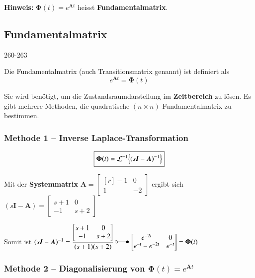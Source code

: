 \textbf{Hinweis:} $\bm{\Phi}(t) = e^{\bm{A} t}$ heisst \textbf{Fundamentalmatrix}. 


\subsection{Fundamentalmatrix}{260-263}

Die Fundamentalmatrix (auch Transitionsmatrix genannt) ist definiert als
$$ \boxed{  e^{\bm{A} t} = \bm{\Phi}(t) } $$

Sie wird benötigt, um die Zustandsraumdarstellung im \textbf{Zeitbereich} zu lösen.
Es gibt mehrere Methoden, die quadratische $(n \times n)$ Fundamentalmatrix zu bestimmen.


\subsubsection{Methode 1 -- Inverse Laplace-Transformation}

$$ \boxed{ \bm{\Phi}(t) = \mathcal{L}^{-1} \Bigl\{ (s \bm{I} - \bm{A})^{-1}  \Bigr\} } $$



Mit der \textbf{Systemmatrix} $\bm{A} = \begin{bmatrix*}[r] -1 & 0 \\ 1 & -2 \end{bmatrix*}$ ergibt sich 
$(s \bm{I} - \bm{A}) = \begin{bmatrix*} s+1 & 0 \\ -1 & s+2 \end{bmatrix*}$

Somit ist $(s \bm{I} - \bm{A})^{-1} = \dfrac{\begin{bmatrix*} s+1 & 0 \\ -1 & s+2 \end{bmatrix*}}{(s+1)(s+2)} \,
\laplace \, \begin{bmatrix*} e^{-2t} & 0 \\ e^{-t} - e^{-2t} & e^{-t} \end{bmatrix*} = \bm{\Phi}(t)$


\subsubsection{Methode 2 -- Diagonalisierung von $\bm{\Phi}(t) = e^{\bm{A} t}$}

